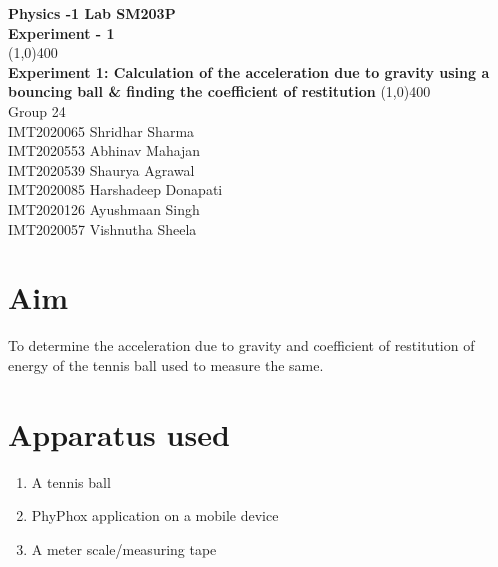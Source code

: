 \documentclass{article}
\begin{document}
\begin{sloppypar}
\begin{titlepage}
\begin{center}
\vspace*{0.5cm}
\LARGE{\textbf{Physics -1 Lab SM203P}}\\
\Large{\textbf{Experiment - 1}}\\
\vfill
\line(1,0){400}\\[1mm]
\vspace{10mm}
\Large{\textbf{Experiment 1: Calculation of the acceleration due to gravity using a bouncing ball \& finding the coefficient of restitution}}
\vspace{10mm}
\line(1,0){400}\\[1mm]
\vfill
Group 24 \\
IMT2020065 Shridhar Sharma  \\
IMT2020553 Abhinav Mahajan  \\
IMT2020539 Shaurya Agrawal \\
IMT2020085 Harshadeep Donapati \\
IMT2020126 Ayushmaan Singh \\
IMT2020057 Vishnutha Sheela \\
\end{center}
\end{titlepage}


\section{Aim}
To determine the acceleration due to gravity and coefficient of restitution of energy of the tennis ball used to measure the same.
\section{Apparatus used}
\begin{enumerate}
\item A tennis ball
\item PhyPhox application on a mobile device
\item A meter scale/measuring tape
\end{enumerate}


\end{sloppypar}
\end{document}
